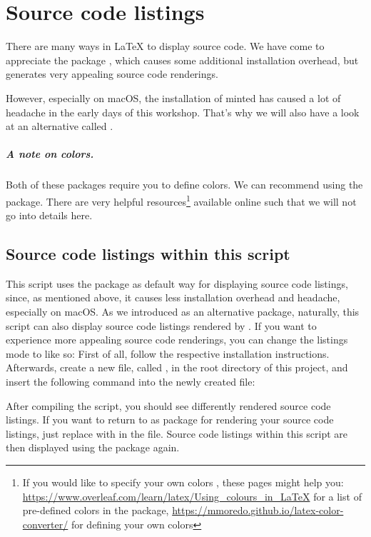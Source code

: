\chapter{Source code listings}
\label{sec:source-code-listings}

There are many ways in \LaTeX{} to display source code.
We have come to appreciate the package , which causes some additional installation overhead, but generates very appealing source code renderings.

However, especially on macOS, the installation of minted has caused a lot of headache in the early days of this workshop.
That's why we will also have a look at an alternative called . 

\paragraph{A note on colors.} Both of these packages require you to define colors. 
We can recommend using the  package.
There are very helpful resources\footnote{If you would like to specify your own colors , these pages might help you: \url{https://www.overleaf.com/learn/latex/Using_colours_in_LaTeX} for a list of pre-defined colors in the  package, \url{https://mmoredo.github.io/latex-color-converter/} for defining your own colors} available online such that we will not go into details here.




\section{Source code listings within this script}

This script uses the package  as default way for displaying source code listings, since, as mentioned above, it causes less installation overhead and headache, especially on macOS. As we introduced  as an alternative package, naturally, this script can also display source code listings rendered by . If you want to experience more appealing source code renderings, you can change the listings mode to  like so: First of all, follow the respective installation instructions. Afterwards, create a new file, called , in the root directory of this project, and insert the following command into the newly created file: 


After compiling the script, you should see differently rendered source code listings. If you want to return to  as package for rendering your source code listings, just replace  with  in the  file. Source code listings within this script are then displayed using the  package again.